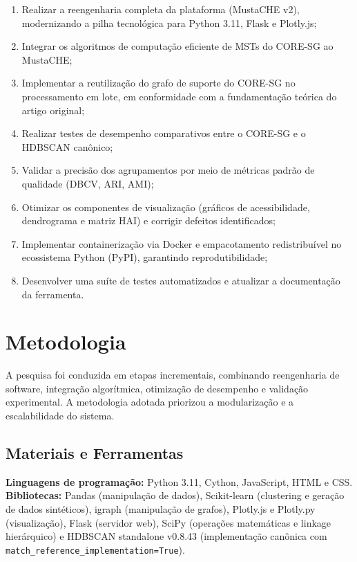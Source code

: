 \documentclass[12pt,a4paper,oneside]{article}
\begin{document}
\begin{enumerate}
  \item Realizar a reengenharia completa da plataforma (MustaCHE v2), modernizando a pilha
        tecnológica para Python 3.11, Flask e Plotly.js;
  \item Integrar os algoritmos de computação eficiente de MSTs do CORE-SG ao MustaCHE;
  \item Implementar a reutilização do grafo de suporte do CORE-SG no processamento em lote,
        em conformidade com a fundamentação teórica do artigo original;
  \item Realizar testes de desempenho comparativos entre o CORE-SG e o HDBSCAN canônico;
  \item Validar a precisão dos agrupamentos por meio de métricas padrão de qualidade
        (DBCV, ARI, AMI);
  \item Otimizar os componentes de visualização (gráficos de acessibilidade, dendrograma e
        matriz HAI) e corrigir defeitos identificados;
  \item Implementar containerização via Docker e empacotamento redistribuível no ecossistema
        Python (PyPI), garantindo reprodutibilidade;
  \item Desenvolver uma suíte de testes automatizados e atualizar a documentação da ferramenta.
\end{enumerate}

\section{Metodologia}

A pesquisa foi conduzida em etapas incrementais, combinando reengenharia de software,
integração algorítmica, otimização de desempenho e validação experimental. A metodologia
adotada priorizou a modularização e a escalabilidade do sistema.

\subsection{Materiais e Ferramentas}

\textbf{Linguagens de programação:} Python 3.11, Cython, JavaScript, HTML e CSS.
\textbf{Bibliotecas:} Pandas (manipulação de dados), Scikit-learn \cite{pedregosa2011scikit}
(clustering e geração de dados sintéticos), igraph (manipulação de grafos), Plotly.js e
Plotly.py (visualização), Flask (servidor web), SciPy (operações matemáticas e linkage
hierárquico) e HDBSCAN standalone v0.8.43 (implementação canônica com
\texttt{match\_reference\_implementation=True}).
\end{document}
